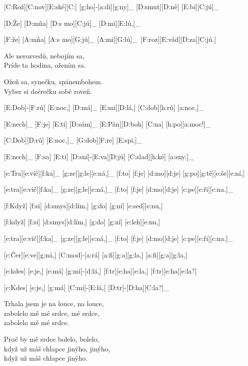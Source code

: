 
[C:Rož][C:nov][E:ské][C:] [g:ho]-[a:di][g:ny]_ [D:smut][D:ně] [E:bi][C:jú]_\

[D:Že] [D:mňa] [D:s mo][C:jú]_ [D:mi][E:lú,]_\

[F:že] [A:mňa] [A:s mo][G:jú]_ [A:mi][G:lú]_\
[F:roz][E:vád][D:za][C:jú.]\

Ale nerozvedů, nebojím sa,\\
Príde ta hodina, ožením sa.

Ožeň sa, synečku, spánembohem.\\
Vyber si dcérečku sobě roveň.



[E:Dob]-[F:rú] [E:noc,] [D:má]_ [E:mi][D:lá,] [C:dob][h:rú] [a:noc,]_\

[E:nech]_ [F:je] [E:ti] [D:sám]_ [E:Pán][D:boh] [C:na] [h:po][a:moc!]_\

[C:Dob][D:rú] [E:noc,]_ [G:dob][F:re] [E:spi,]_\

[E:nech]_ [F:sa] [E:ti] [D:sní]-[E:va][D:jú] [C:slad][h:ké] [a:sny.]_\



[e:Tra][e:vič][f:ka]_ [g:ze][g:le][e:ná,]_ [f:to] [f:je] [d:mo][d:je] [g:po][g:tě][e:še][e:ní,]\

[e:tra][e:vič][f:ka]_ [g:ze][g:le][e:ná,]_ [f:to] [f:je] [d:mo][d:je] [c:pe][e:ři][c:na.]_\

[f:Když] [f:si] [d:smys][d:lím,] [g:do] [g:ní] [e:sed][e:nu,]\

[f:když] [f:si] [d:smys][d:lím,] [g:do] [g:ní] [e:leh][e:nu,]\

[e:tra][e:vič][f:ka]_ [g:ze][g:le][e:ná,]_ [f:to] [f:je] [d:mo][d:je] [c:pe][e:ři][c:na.]_\



[c:Čer][e:ve][g:ná,] [C:mod]-[a:rá] [a:fi][g:a][g:la,] [a:fi][g:a][g:la,]\

[e:kdes] [e:je,] [e:má] [g:mi]-[d:lá,] [f:tr][e:ha][e:la,] [f:tr][e:ha][e:la?]\

[c:Kdes] [e:je,] [g:má] [C:mi]-[E:lá,] [D:tr]-[D:ha][C:la?]_\

Trhala jsem je na louce, na louce,\\
zabolelo mě mé srdce, mé srdce,\\
zabolelo mě mé srdce.

Proč by mě srdce bolelo, bolelo,\\
když už máš chlapce jinýho, jinýho,\\
když už máš chlapce jinýho.


